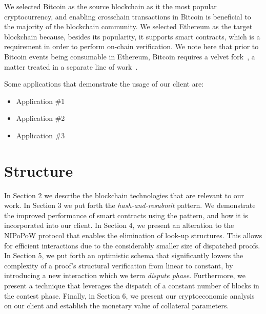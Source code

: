 We selected Bitcoin as the source blockchain as it the most popular cryptocurrency,
and enabling crosschain transactions in Bitcoin is beneficial to the
majority of the blockchain community. We selected Ethereum as the target blockchain
because, besides its popularity, it supports smart contracts, which is a
requirement in order to perform on-chain verification. We note here that
prior to Bitcoin events being consumable in Ethereum, Bitcoin requires a
velvet fork~\cite{velvet-fork}, a matter treated in a separate line of
work~\cite{velvet-nipopows}.

\bigbreak Some applications that demonstrate the usage of our client are:

\begin{itemize}
    \item{Application \#1}
    \item{Application \#2}
    \item{Application \#3}
\end{itemize}

\section{Structure}


In Section 2 we describe the blockchain technologies that are relevant to our
work. In Section 3 we put forth the \emph{hash-and-resubmit} pattern. We
demonstrate the improved performance of smart contracts using the pattern, and
how it is incorporated into our client. In Section 4, we present an alteration
to the NIPoPoW protocol that enables the elimination of look-up structures.
This allows for efficient interactions due to the considerably smaller size of
dispatched proofs. In Section 5, we put forth an optimistic schema that
significantly lowers the complexity of a proof's structural verification from
linear to constant, by introducing a new interaction which we term
\emph{dispute phase}. Furthermore, we present a technique that leverages the
dispatch of a constant number of blocks in the contest phase. Finally, in
Section 6, we present our cryptoeconomic analysis on our client and establish
the monetary value of collateral parameters.
